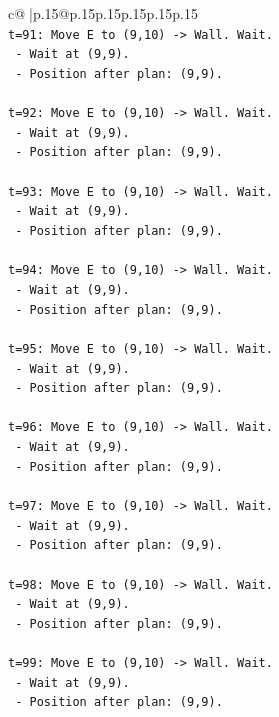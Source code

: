 \documentclass{article}
\begin{document}
{\begin{supertabular}{c@{$\;$}|p{.15\linewidth}@{}p{.15\linewidth}p{.15\linewidth}p{.15\linewidth}p{.15\linewidth}p{.15\linewidth}}
{{{\\ 
\texttt{t=91: Move E to (9,10) {-}> Wall. Wait.} \\
\texttt{   {-} Wait at (9,9).} \\
\texttt{   {-} Position after plan: (9,9).} \\
\\ 
\texttt{t=92: Move E to (9,10) {-}> Wall. Wait.} \\
\texttt{   {-} Wait at (9,9).} \\
\texttt{   {-} Position after plan: (9,9).} \\
\\ 
\texttt{t=93: Move E to (9,10) {-}> Wall. Wait.} \\
\texttt{   {-} Wait at (9,9).} \\
\texttt{   {-} Position after plan: (9,9).} \\
\\ 
\texttt{t=94: Move E to (9,10) {-}> Wall. Wait.} \\
\texttt{   {-} Wait at (9,9).} \\
\texttt{   {-} Position after plan: (9,9).} \\
\\ 
\texttt{t=95: Move E to (9,10) {-}> Wall. Wait.} \\
\texttt{   {-} Wait at (9,9).} \\
\texttt{   {-} Position after plan: (9,9).} \\
\\ 
\texttt{t=96: Move E to (9,10) {-}> Wall. Wait.} \\
\texttt{   {-} Wait at (9,9).} \\
\texttt{   {-} Position after plan: (9,9).} \\
\\ 
\texttt{t=97: Move E to (9,10) {-}> Wall. Wait.} \\
\texttt{   {-} Wait at (9,9).} \\
\texttt{   {-} Position after plan: (9,9).} \\
\\ 
\texttt{t=98: Move E to (9,10) {-}> Wall. Wait.} \\
\texttt{   {-} Wait at (9,9).} \\
\texttt{   {-} Position after plan: (9,9).} \\
\\ 
\texttt{t=99: Move E to (9,10) {-}> Wall. Wait.} \\
\texttt{   {-} Wait at (9,9).} \\
\texttt{   {-} Position after plan: (9,9).} \\
}}}
\end{supertabular}}
\end{document}
